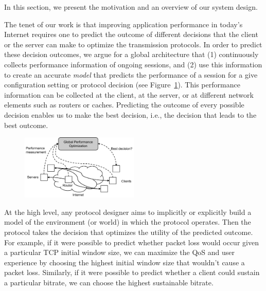
In this section, we present the motivation and an overview of our
system design.

The tenet of our work is that improving application performance in
today's Internet requires one to predict the outcome of different
decisions that the client or the server can make to optimize the
transmission protocols. In order to predict these decision outcomes,
we argue for a global architecture that (1) continuously collects
performance information of ongoing sessions, and (2) use this
information to create an accurate \emph{model} that predicts the
performance of a session for a give configuration setting or protocol
decision (see Figure~\ref{fig:global-control--overview}). This
performance information can be collected at the client, at the server,
or at different network elements such as routers or caches. Predicting
the outcome of every possible decision enables us to make the best
decision, i.e., the decision that leads to the best outcome.

\begin{figure}[h!]
\centering
 \includegraphics[width=0.5\textwidth] {figures/global-control-overview.pdf}
\label{fig:global-control--overview}
\end{figure}


At the high level, any protocol designer aims to implicitly or
explicitly build a model of the environment (or world) in which the
protocol operates. Then the protocol takes the decision that optimizes
the utility of the predicted outcome.  For example, if it were
possible to predict whether packet loss would occur given a particular
TCP initial window size, we can maximize the QoS and user experience
by choosing the highest initial window size that wouldn't cause a
packet loss.  Similarly, if it were possible to predict whether a
client could sustain a particular bitrate, we can choose the highest
sustainable bitrate.

